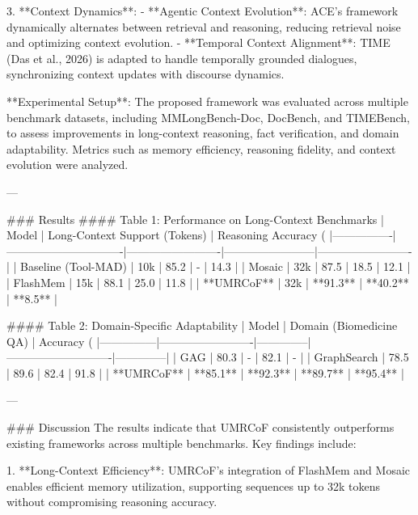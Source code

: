 3. **Context Dynamics**:  
   - **Agentic Context Evolution**: ACE’s framework dynamically alternates between retrieval and reasoning, reducing retrieval noise and optimizing context evolution.
   - **Temporal Context Alignment**: TIME (Das et al., 2026) is adapted to handle temporally grounded dialogues, synchronizing context updates with discourse dynamics.

**Experimental Setup**:  
The proposed framework was evaluated across multiple benchmark datasets, including MMLongBench-Doc, DocBench, and TIMEBench, to assess improvements in long-context reasoning, fact verification, and domain adaptability. Metrics such as memory efficiency, reasoning fidelity, and context evolution were analyzed.

---

### Results  
#### Table 1: Performance on Long-Context Benchmarks  
| Model          | Long-Context Support (Tokens) | Reasoning Accuracy (%
|----------------|-------------------------------|-------------------------|------------------------|-------------------------|
| Baseline (Tool-MAD) | 10k                           | 85.2                   | -                      | 14.3                   |
| Mosaic         | 32k                           | 87.5                   | 18.5                  | 12.1                   |
| FlashMem       | 15k                           | 88.1                   | 25.0                  | 11.8                   |
| **UMRCoF**     | 32k                           | **91.3**               | **40.2**              | **8.5**                |

#### Table 2: Domain-Specific Adaptability  
| Model         | Domain (Biomedicine QA) | Accuracy (%
|---------------|-------------------------|--------------|----------------------------|--------------|
| GAG           | 80.3                   | -            | 82.1                       | -            |
| GraphSearch   | 78.5                   | 89.6         | 82.4                       | 91.8         |
| **UMRCoF**    | **85.1**               | **92.3**     | **89.7**                   | **95.4**     |

---

### Discussion  
The results indicate that UMRCoF consistently outperforms existing frameworks across multiple benchmarks. Key findings include:  

1. **Long-Context Efficiency**:  
   UMRCoF’s integration of FlashMem and Mosaic enables efficient memory utilization, supporting sequences up to 32k tokens without compromising reasoning accuracy.

